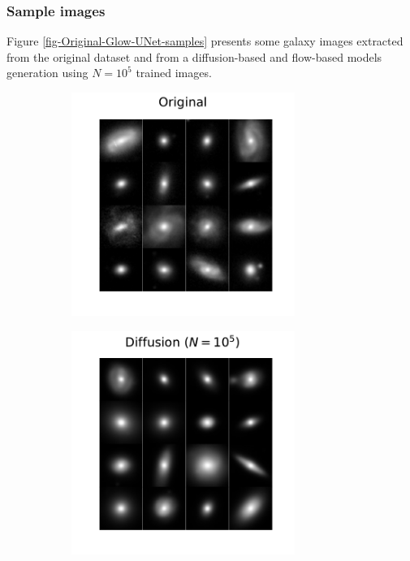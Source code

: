 \documentclass[11pt]{amsart}
\begin{document}
\subsubsection{Sample images}
Figure \ref{fig-Original-Glow-UNet-samples} presents some galaxy images extracted from the original dataset and from a diffusion-based and flow-based models generation using $N=10^5$ trained images. 
%
\begin{figure}
    \centering
    \vspace{-0cm}
    \begin{subfigure}[t]{0.30\columnwidth}
    \begin{center}
        \centering
        \includegraphics[width=0.8\textwidth]{fig-original_samples_gray.pdf}
    \end{center}
    \end{subfigure}%
    \begin{subfigure}[t]{0.30\columnwidth}
    \begin{center}
        \centering
        \includegraphics[width=0.8\textwidth]{fig-diffusion_samples_gray.pdf}

\end{center}
\end{subfigure}
\end{figure}
\end{document}
